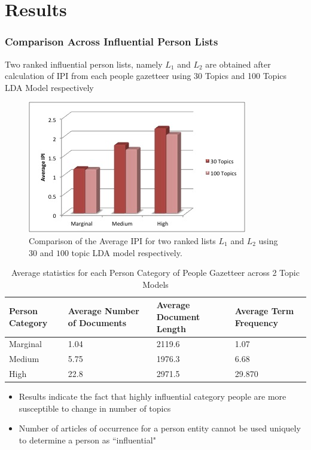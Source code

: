 \documentclass{beamer}
\begin{document}
\section{Results}
\begin{frame}[allowframebreaks]
\frametitle{Comparison Across Influential Person Lists}
Two ranked influential person lists, namely $L_1$ and $L_2$ are obtained after calculation of IPI from each people gazetteer using 30 Topics and 100 Topics LDA Model respectively
\begin{figure}[h]
\begin{center}
\includegraphics[scale=0.5]{IPIChart}
\end{center}
\caption{Comparison of the Average IPI for two ranked lists $L_1$ and $L_2$ using $30$ and $100$ topic LDA model respectively.}
\end{figure}


\begin{table}
\begin{center}
    \begin{tabular}{|p{2cm}|p{2cm}|p{2cm}|p{2cm}|}
    \hline
    \textbf{Person Category}   & \textbf{Average Number of Documents}   &  \textbf{Average Document Length}	&  \textbf{Average Term Frequency}	\\  \hline
Marginal  & 1.04 & 2119.6 & 1.07 	\\ \hline
Medium  & 5.75 & 1976.3 & 6.68  \\ \hline
High  & 22.8 & 2971.5 & 29.870	 \\	\hline 
  \end{tabular}
  \end{center}
    \caption {Average statistics for each Person Category of People Gazetteer across 2 Topic Models}
\end{table}
\begin{itemize}
\item
Results indicate the fact that highly influential category people are more susceptible to change in number of topics
\item
Number of articles of occurrence for a person entity cannot be used uniquely to determine a person as ``influential"
\end{itemize}
\end{frame}
\end{document}
